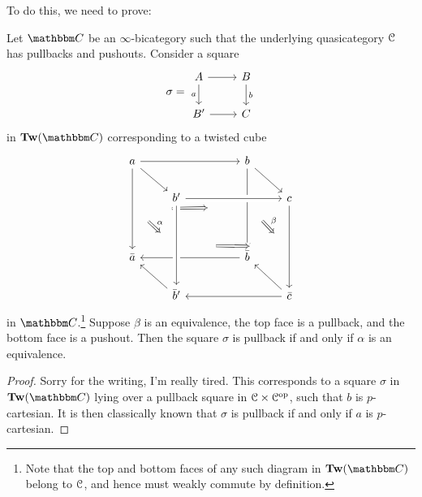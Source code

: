 \documentclass[main.tex]{subfiles}
\begin{document}
To do this, we need to prove:
\begin{lemma}
  Let $\CC$ be an $\infty$-bicategory such that the underlying quasicategory $\mathcal{C}$ has pullbacks and pushouts. Consider a square
  \begin{equation*}
    \sigma =
    \begin{tikzcd}
      A
      \arrow[r]
      \arrow[d, swap, "a"]
      & B
      \arrow[d, "b"]
      \\
      B'
      \arrow[r]
      & C
    \end{tikzcd}
  \end{equation*}
  in $\Tw(\CC)$ corresponding to a twisted cube
  \begin{equation*}
    \begin{tikzcd}
      a
      \arrow[rrr]
      \arrow[dr, ""{name=TL, right}]
      \arrow[ddd, ""{name=R1, right}]
      &&& b
      \arrow[ddd, ""{name=L2, left}, ""{name=R2, right}]
      \arrow[dr, ""{name=TR, left}]
      \arrow[from=R1, to=L2, Rightarrow, shorten=7ex]
      \\
      & b'
      \arrow[rrr, crossing over]
      &&& c
      \arrow[ddd, ""{name=L4, left}"]
      \\
      \\
      \bar{a}
      &&& \bar{b}
      \arrow[lll]
      \\
      & \bar{b}'
      \arrow[from=uuu, crossing over, ""{name=L3, left}, ""{name=R3, right}]
      \arrow[ul]
      &&& \bar{c}
      \arrow[lll]
      \arrow[ul]
      \arrow[from=R1, to=L3, Rightarrow, shorten=3ex, "\alpha"]
      \arrow[from=R3, to=L4, Rightarrow, crossing over, shorten=7ex]
      \arrow[from=R2, to=L4, Rightarrow, shorten=3ex, "\beta"]
    \end{tikzcd}
  \end{equation*}
  in $\CC$.\footnote{Note that the top and bottom faces of any such diagram in $\Tw(\CC)$ belong to $\mathcal{C}$, and hence must weakly commute by definition.} Suppose $\beta$ is an equivalence, the top face is a pullback, and the bottom face is a pushout. Then the square $\sigma$ is pullback if and only if $\alpha$ is an equivalence.
\end{lemma}
\begin{proof}
  Sorry for the writing, I'm really tired. This corresponds to a square $\sigma$ in $\Tw(\CC)$ lying over a pullback square in $\mathcal{C} \times \mathcal{C}^{\mathrm{op}}$, such that $b$ is $p$-cartesian. It is then classically known that $\sigma$ is pullback if and only if $a$ is $p$-cartesian.
\end{proof}
\end{document}
